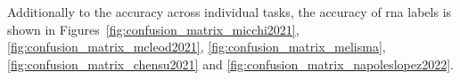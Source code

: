 
Additionally to the accuracy across individual tasks, the
accuracy of \gls{rna} labels is shown in
Figures~\ref{fig:confusion_matrix_micchi2021},
\ref{fig:confusion_matrix_mcleod2021},
\ref{fig:confusion_matrix_melisma},
\ref{fig:confusion_matrix_chensu2021} and
\ref{fig:confusion_matrix_napoleslopez2022}.
